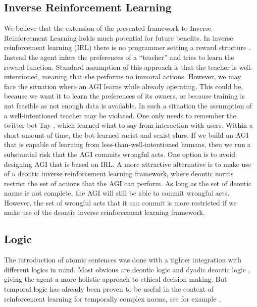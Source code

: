 \subsection{Inverse Reinforcement Learning}
We believe that the extension of the presented framework to Inverse Reinforcement Learning holds much potential for future benefits. In inverse reinforcement learning (IRL) there is no programmer setting a reward structure \citep{ng2000algorithms}. Instead the agent infers the preferences of a ``teacher'' and tries to learn the reward function. Standard assumption of this approach is that the teacher is well-intentioned, meaning that she performs no immoral actions. However, we may face the situation where an AGI learns while already operating. This could be, because we want it to learn the preferences of its owners, or because training is not feasible as not enough data is available. In such a situation the assumption of a well-intentioned teacher may be violated. One only needs to remember the twitter bot Tay \citep{reese2016tay}, which learned what to say from interaction with users. Within a short amount of time, the bot learned racist and sexist slurs. If we build an AGI that is capable of learning from less-than-well-intentioned humans, then we run a substantial risk that the AGI commits wrongful acts. One option is to avoid designing AGI that is based on IRL. A more attractive alternative is to make use of a deontic inverse reinforcement learning framework, where deontic norms restrict the set of actions that the AGI can perform. As long as the set of deontic norms is not complete, the AGI will still be able to commit wrongful acts. However, the set of wrongful acts that it can commit is more restricted if we make use of the deontic inverse reinforcement learning framework. 

\subsection{Logic}
\label{sec:logic}

The introduction of atomic sentences was done with a tighter integration with different logics in mind. Most obvious are deontic logic \citep{horty2001agency} and dyadic deontic logic \citep{prakken1997dyadic}, giving the agent a more holistic approach to ethical decision making. But temporal logic has already been proven to be useful in the context of reinforcement learning for temporally complex norms, see for example \citet{ding2011ltl,wolff2012robust}. 